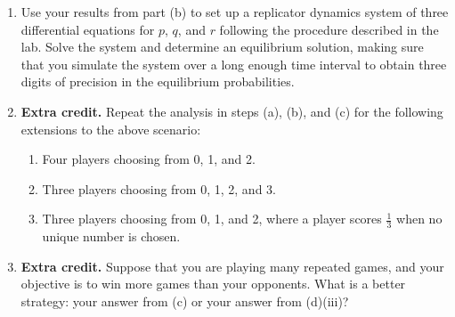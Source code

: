 \documentclass[12pt]{article}
\begin{document}
\begin{enumerate}
\begin{enumerate}
	calculate the expected payoff of choosing 0, 1, or 2.
      \item Use your results from part (b) to set up a replicator dynamics
	system of three differential equations for $p$, $q$, and $r$ following
	the procedure described in the lab. Solve the system and determine
	an equilibrium solution, making sure that you simulate the system over
	a long enough time interval to obtain three digits of precision in the
	equilibrium probabilities.
      \item \textbf{Extra credit.} Repeat the analysis in steps (a), (b), and (c) for the following extensions to the above scenario:
	\begin{enumerate}
	  \item Four players choosing from 0, 1, and 2.
	  \item Three players choosing from 0, 1, 2, and 3.
	  \item Three players choosing from 0, 1, and 2, where a player scores
	   $ \frac{1}{3}$ when no unique number is chosen.
	\end{enumerate}
      \item \textbf{Extra credit.} Suppose that you are playing many repeated games,
	and your objective is to win more games than your opponents. What is a
	better strategy: your answer from (c) or your answer from (d)(iii)?
    \end{enumerate}

\end{enumerate}
\end{document}
